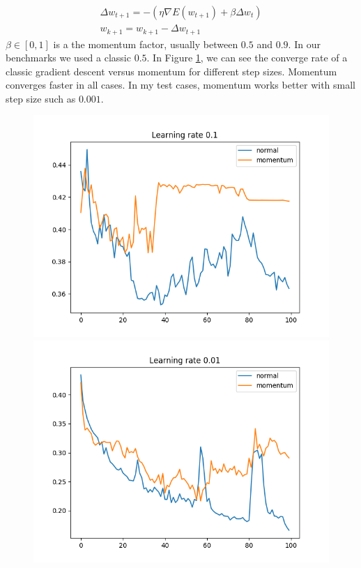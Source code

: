 \documentclass[11pt]{article}
\begin{document}
\begin{equation}
	\label{eq: momentum}
	\begin{split}
	\Delta w_{ t + 1} = - (\eta \nabla E(w_{t + 1}) + \beta \Delta w_t) \\
	 w_{k + 1} = w_{k + 1} -   \Delta w_{ t + 1}
	 \end{split}
\end{equation}
$\beta \in [0,1]$ is a the momentum factor, usually between $0.5$ and $0.9$. In our benchmarks we used a classic $0.5$. In Figure \ref{fig:momentum}, we can see the converge rate of a classic gradient descent versus momentum for different step sizes. Momentum converges faster in all cases. In my test cases, momentum works better with small step size such as $0.001$.
\begin{figure}[H]
\label{fig:momentum}
\centering
\includegraphics[scale=0.5]{images/momentum_plot_0,1.png}	
\includegraphics[scale=0.5]{images/momentum_plot_0,01.png}	

\end{figure}
\end{document}
